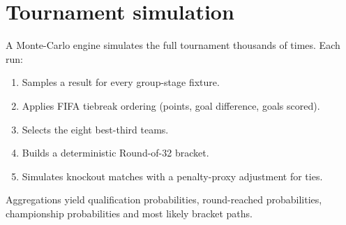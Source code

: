 \section{Tournament simulation}
A Monte-Carlo engine simulates the full tournament thousands of times. Each
run:
\begin{enumerate}
  \item Samples a result for every group-stage fixture.
  \item Applies FIFA tiebreak ordering (points, goal difference, goals scored).
  \item Selects the eight best-third teams.
  \item Builds a deterministic Round-of-32 bracket.
  \item Simulates knockout matches with a penalty-proxy adjustment for ties.
\end{enumerate}
Aggregations yield qualification probabilities, round-reached probabilities,
championship probabilities and most likely bracket paths.
